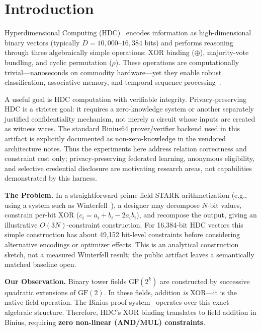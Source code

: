 \documentclass[11pt,twocolumn]{article}
\begin{document}
\section{Introduction}

Hyperdimensional Computing (HDC)~\cite{kanerva2009hyperdimensional} encodes information as high-dimensional binary vectors (typically $D = 10{,}000$--$16{,}384$ bits) and performs reasoning through three algebraically simple operations: XOR binding ($\oplus$), majority-vote bundling, and cyclic permutation ($\rho$). These operations are computationally trivial---nanoseconds on commodity hardware---yet they enable robust classification, associative memory, and temporal sequence processing~\cite{rahimi2016robust}.

A useful goal is HDC computation with verifiable integrity. Privacy-preserving HDC is a stricter goal: it requires a zero-knowledge system or another separately justified confidentiality mechanism, not merely a circuit whose inputs are created as witness wires. The standard Binius64 prover/verifier backend used in this artifact is explicitly documented as non-zero-knowledge in the vendored architecture notes. Thus the experiments here address relation correctness and constraint cost only; privacy-preserving federated learning, anonymous eligibility, and selective credential disclosure are motivating research areas, not capabilities demonstrated by this harness.

\textbf{The Problem.} In a straightforward prime-field STARK arithmetization (e.g., using a system such as Winterfell~\cite{winterfell}), a designer may decompose $N$-bit values, constrain per-bit XOR ($c_i = a_i + b_i - 2a_ib_i$), and recompose the output, giving an illustrative $O(3N)$-constraint construction. For 16,384-bit HDC vectors this simple construction has about 49,152 bit-level constraints before considering alternative encodings or optimizer effects. This is an analytical construction sketch, not a measured Winterfell result; the public artifact leaves a semantically matched baseline open.

\textbf{Our Observation.} Binary tower fields $\mathrm{GF}(2^k)$ are constructed by successive quadratic extensions of $\mathrm{GF}(2)$. In these fields, addition \emph{is} XOR---it is the native field operation. The Binius proof system~\cite{diamond2023binius} operates over this exact algebraic structure. Therefore, HDC's XOR binding translates to field addition in Binius, requiring \textbf{zero non-linear (AND/MUL) constraints}.
\end{document}
